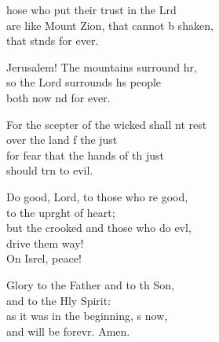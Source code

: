\settowidth{\versewidth}{For the scepter of the wicked shall not rest *}
\begin{psalmverse}%
  \begin{patverse}
hose who put their trust in the Lrd\Flex\\
are like Mount Zion, that cannot b shaken,\Med\\
that stnds for ever.

Jerusalem! The mountains surround hr,\Flex\\
so the Lord surrounds hs people\Med\\
both now nd for ever.

For the scepter of the wicked shall nt rest\Med\\
over the land f the just\\
for fear that the hands of th just\Med\\
should trn to evil.

Do good, Lord, to those who re good,\Med\\
to the uprght of heart;\\
but the crooked and those who do ev\pointup{\i}l,\Flex\\
drive them way!\Med\\
On Isrel, peace!

Glory to the Father and to th Son,\Med\\
and to the Hly Spirit:\\
as it was in the beginning, s now,\Med\\
and will be forevr. Amen.
  \end{patverse}
\end{psalmverse}
